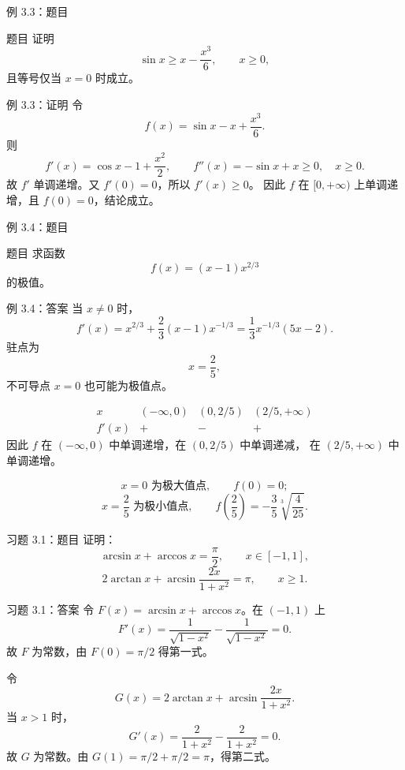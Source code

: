 \documentclass[aspectratio=169,10pt]{ctexbeamer}
\begin{document}
\begin{frame}{例 3.3：题目}
\small
\begin{block}{题目}
证明
\[
  \sin x\ge x-\frac{x^3}{6},\qquad x\ge0,
\]
且等号仅当 $x=0$ 时成立。
\end{block}
\end{frame}

\begin{frame}{例 3.3：证明}
\small
令
\[
  f(x)=\sin x-x+\frac{x^3}{6}.
\]
则
\[
  f'(x)=\cos x-1+\frac{x^2}{2},\qquad
  f''(x)=-\sin x+x\ge0,\quad x\ge0.
\]
故 $f'$ 单调递增。又 $f'(0)=0$，所以 $f'(x)\ge0$。
因此 $f$ 在 $[0,+\infty)$ 上单调递增，且 $f(0)=0$，结论成立。
\end{frame}

\begin{frame}{例 3.4：题目}
\small
\begin{block}{题目}
求函数
\[
  f(x)=(x-1)x^{2/3}
\]
的极值。
\end{block}
\end{frame}

\begin{frame}{例 3.4：答案}
\small
当 $x\ne0$ 时，
\[
  f'(x)=x^{2/3}+\frac23(x-1)x^{-1/3}
       =\frac13x^{-1/3}(5x-2).
\]
驻点为
\[
  x=\frac25,
\]
不可导点 $x=0$ 也可能为极值点。

\[
\begin{array}{c|ccc}
x & (-\infty,0) & (0,2/5) & (2/5,+\infty)\\ \hline
f'(x) & + & - & +
\end{array}
\]
因此 $f$ 在 $(-\infty,0)$ 中单调递增，在 $(0,2/5)$ 中单调递减，
在 $(2/5,+\infty)$ 中单调递增。

\[
  x=0 \text{ 为极大值点},\qquad f(0)=0;
\]
\[
  x=\frac25 \text{ 为极小值点},\qquad
  f\left(\frac25\right)
  =-\frac35\sqrt[3]{\frac4{25}}.
\]
\end{frame}

\begin{frame}{习题 3.1：题目}
\small
证明：
\[
  \arcsin x+\arccos x=\frac\pi2,\qquad x\in[-1,1],
\]
\[
  2\arctan x+\arcsin\frac{2x}{1+x^2}=\pi,\qquad x\ge1.
\]
\end{frame}

\begin{frame}{习题 3.1：答案}
\small
令 $F(x)=\arcsin x+\arccos x$。在 $(-1,1)$ 上
\[
  F'(x)=\frac1{\sqrt{1-x^2}}-\frac1{\sqrt{1-x^2}}=0.
\]
故 $F$ 为常数，由 $F(0)=\pi/2$ 得第一式。

令
\[
  G(x)=2\arctan x+\arcsin\frac{2x}{1+x^2}.
\]
当 $x>1$ 时，
\[
  G'(x)=\frac2{1+x^2}-\frac2{1+x^2}=0.
\]
故 $G$ 为常数。由 $G(1)=\pi/2+\pi/2=\pi$，得第二式。
\end{frame}
\end{document}

